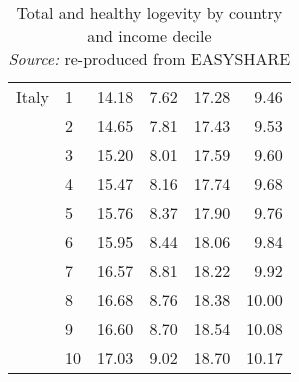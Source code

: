 \begin{table}
\begin{tabular}{llrrrr}
Italy & 1  &   14.18 &   7.62 &  17.28 &   9.46 \\
            & 2  &   14.65 &   7.81 &  17.43 &   9.53 \\
            & 3  &   15.20 &   8.01 &  17.59 &   9.60 \\
            & 4  &   15.47 &   8.16 &  17.74 &   9.68 \\
            & 5  &   15.76 &   8.37 &  17.90 &   9.76 \\
            & 6  &   15.95 &   8.44 &  18.06 &   9.84 \\
            & 7  &   16.57 &   8.81 &  18.22 &   9.92 \\
            & 8  &   16.68 &   8.76 &  18.38 &  10.00 \\
            & 9  &   16.60 &   8.70 &  18.54 &  10.08 \\
            & 10 &   17.03 &   9.02 &  18.70 &  10.17 \\
\bottomrule
\end{tabular}
\captionsetup{justification=centering}
\caption{Total and healthy logevity by country and income decile \\ 
\textit{Source:} re-produced from EASYSHARE }
\end{table}








